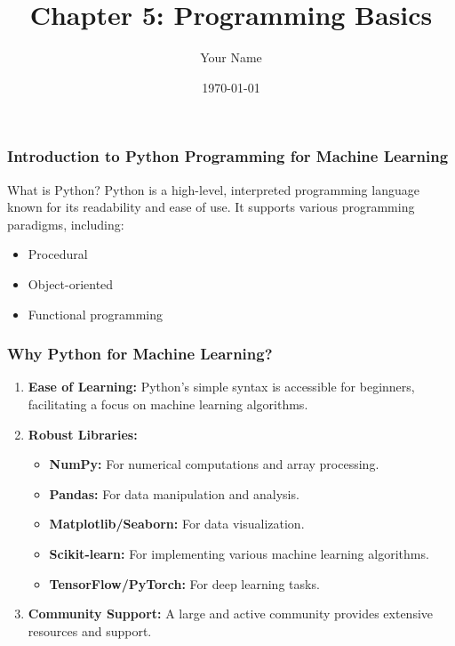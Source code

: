 \documentclass{beamer}
\title{Chapter 5: Programming Basics}
\author{Your Name}
\institute{Your Institution}
\date{\today}
\begin{document}
\frame{\titlepage}

\begin{frame}
    \frametitle{Introduction to Python Programming for Machine Learning}
    \begin{block}{What is Python?}
        Python is a high-level, interpreted programming language known for its readability and ease of use. 
        It supports various programming paradigms, including:
        \begin{itemize}
            \item Procedural
            \item Object-oriented
            \item Functional programming
        \end{itemize}
    \end{block}
\end{frame}

\begin{frame}
    \frametitle{Why Python for Machine Learning?}
    \begin{enumerate}
        \item \textbf{Ease of Learning:} Python's simple syntax is accessible for beginners, facilitating a focus on machine learning algorithms.
        \item \textbf{Robust Libraries:} 
        \begin{itemize}
            \item \textbf{NumPy:} For numerical computations and array processing.
            \item \textbf{Pandas:} For data manipulation and analysis.
            \item \textbf{Matplotlib/Seaborn:} For data visualization.
            \item \textbf{Scikit-learn:} For implementing various machine learning algorithms.
            \item \textbf{TensorFlow/PyTorch:} For deep learning tasks.
        \end{itemize}
        \item \textbf{Community Support:} A large and active community provides extensive resources and support.
    \end{enumerate}
\end{frame}
\end{document}
